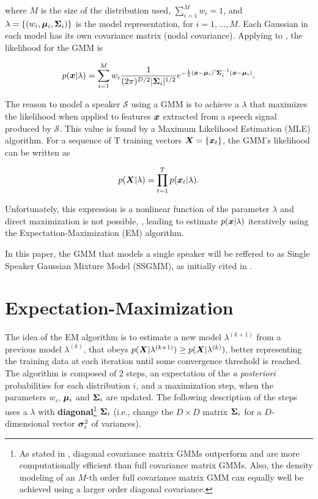 \noindent where $M$ is the size of the distribution used, $\sum_{i=1}^M w_i = 1$, and $\lambda = \{(w_i, \boldsymbol{\mu}_i, \boldsymbol{\Sigma}_i)\}$ is the model representation, for $i = 1, ..., M$. Each Gaussian in each model has its own covariance matrix (nodal covariance). Applying  to , the likelihood for the GMM is

\begin{equation}
    \postpdf{\dvec{x}}{\lambda} = \dgaussianmixture.
    \label{eq:likelihood_gmm}
\end{equation}

The reason to model a speaker $\mathcal{S}$ using a GMM is to achieve a $\lambda$ that maximizes the likelihood when applied to features $\boldsymbol{x}$ extracted from a speech signal produced by $\mathcal{S}$. This value is found by a Maximum Likelihood Estimation (MLE) algorithm. For a sequence of T training vectors $\boldsymbol{X} = \{\boldsymbol{x}_t\}$, the GMM's likelihood can be written as

\begin{equation}
    \postpdf{\boldsymbol{X}}{\lambda} = \prod_{t=1}^T \postpdf{\dvec{x}_t}{\lambda}.
    \label{eq:likelihood_gmm_mle}
\end{equation}

\noindent Unfortunately, this expression is a nonlinear function of the parameter $\lambda$ and direct maximization is not possible, , leading to estimate $p(\boldsymbol{x}|\lambda)$ iteratively using the Expectation-Maximization (EM) algorithm.

In this paper, the GMM that models a single speaker will be reffered to as Single Speaker Gaussian Mixture Model (SSGMM), as initially cited in .

\section{Expectation-Maximization}
\label{sec:em}

The idea of the EM algorithm is to estimate a new model $\lambda^{(k+1)}$ from a previous model $\lambda^{(k)}$, that obeys $p(\boldsymbol{X}|\lambda^{(k+1)}) \geq p(\boldsymbol{X}|\lambda^{(k)})$, better representing the training data at each iteration until some convergence threshold is reached. The algorithm is composed of 2 steps, an expectation of the \emph{a posteriori} probabilities for each distribution $i$, and a maximization step, when the parameters $w_i$, $\boldsymbol{\mu}_i$ and $\boldsymbol{\Sigma}_i$ are updated. The following description of the steps uses a $\lambda$ with \textbf{diagonal}\footnote{As stated in , diagonal covariance matrix GMMs outperform and are more computationally efficient than full covariance matrix GMMs. Also, the density modeling of an $M$-th order full covariance matrix GMM can equally well be achieved using a larger order diagonal covariance.} $\boldsymbol{\Sigma}_i$ (i.e., change the $D \times D$ matrix $\boldsymbol{\Sigma}_i$ for a $D$-dimensional vector $\boldsymbol{\sigma}_i^2$ of variances).

